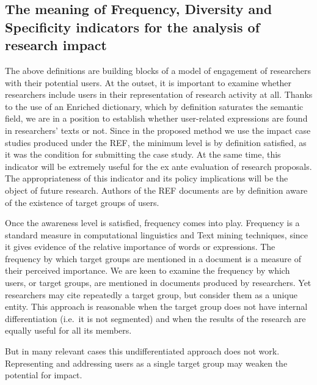 \documentclass[b5paper,]{book}
\theoremstyle{definition}
\theoremstyle{definition}
\theoremstyle{definition}
\theoremstyle{remark}
\begin{document}
\subsection{The meaning of Frequency, Diversity and Specificity
indicators for the analysis of research
impact}\label{the-meaning-of-frequency-diversity-and-specificity-indicators-for-the-analysis-of-research-impact}

The above definitions are building blocks of a model of engagement of
researchers with their potential users. At the outset, it is important
to examine whether researchers include users in their representation of
research activity at all. Thanks to the use of an Enriched dictionary,
which by definition saturates the semantic field, we are in a position
to establish whether user-related expressions are found in researchers'
texts or not. Since in the proposed method we use the impact case
studies produced under the REF, the minimum level is by definition
satisfied, as it was the condition for submitting the case study. At the
same time, this indicator will be extremely useful for the ex ante
evaluation of research proposals. The appropriateness of this indicator
and its policy implications will be the object of future research.
Authors of the REF documents are by definition aware of the existence of
target groups of users.

Once the awareness level is satisfied, frequency comes into play.
Frequency is a standard measure in computational linguistics and Text
mining techniques, since it gives evidence of the relative importance of
words or expressions. The frequency by which target groups are mentioned
in a document is a measure of their perceived importance. We are keen to
examine the frequency by which users, or target groups, are mentioned in
documents produced by researchers. Yet researchers may cite repeatedly a
target group, but consider them as a unique entity. This approach is
reasonable when the target group does not have internal differentiation
(i.e.~it is not segmented) and when the results of the research are
equally useful for all its members.

But in many relevant cases this undifferentiated approach does not work.
Representing and addressing users as a single target group may weaken
the potential for impact.
\end{document}
